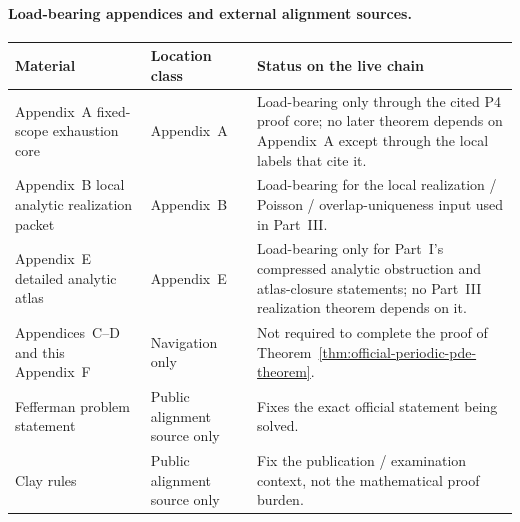 \paragraph{Load-bearing appendices and external alignment sources.}
\begin{center}
\footnotesize
\renewcommand{\arraystretch}{1.14}
\setlength{\tabcolsep}{4pt}
\begin{tabularx}{0.98\textwidth}{@{}L{0.24\textwidth}L{0.16\textwidth}Y@{}}
\toprule
\textbf{Material} & \textbf{Location class} & \textbf{Status on the live chain}\\
\midrule
Appendix~A fixed-scope exhaustion core & Appendix~A & Load-bearing only through the cited P4 proof core; no later theorem depends on Appendix~A except through the local labels that cite it.\\
Appendix~B local analytic realization packet & Appendix~B & Load-bearing for the local realization / Poisson / overlap-uniqueness input used in Part~III.\\
Appendix~E detailed analytic atlas & Appendix~E & Load-bearing only for Part~I's compressed analytic obstruction and atlas-closure statements; no Part~III realization theorem depends on it.\\
Appendices~C--D and this Appendix~F & Navigation only & Not required to complete the proof of Theorem~\ref{thm:official-periodic-pde-theorem}.\\
Fefferman problem statement & Public alignment source only & Fixes the exact official statement being solved.\\
Clay rules & Public alignment source only & Fix the publication / examination context, not the mathematical proof burden.\\
\bottomrule
\end{tabularx}
\end{center}

